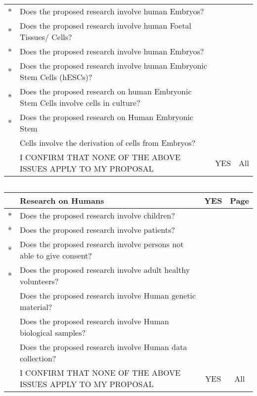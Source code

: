 \documentclass[12pt]{article}
\begin{document}
{\footnotesize
\begin{tabular}{|c|l|c|c|}
\hline
$\ast$ &      Does the proposed research involve human Embryos?             &  &                      \\
$\ast$  &       Does the proposed research involve human Foetal Tissues/ Cells?         &  &           \\
\hline
$\ast$ &      Does the proposed research involve human Embryos?             &  &                      \\
\hline
$\ast$ &        Does the proposed research involve human Embryonic Stem Cells (hESCs)?       &  &       \\
\hline
$\ast$ &        Does the proposed research on human Embryonic Stem Cells involve cells in culture?       &  &    \\
\hline
$\ast$ &        Does the proposed research on Human Embryonic Stem  &  & \\
&Cells involve the derivation of cells from Embryos?   &  & \\
\hline
      &    I CONFIRM THAT NONE OF THE ABOVE ISSUES APPLY TO MY PROPOSAL    &     YES  &    All     \\
\hline
\end{tabular}

$\;$\\ $\;$\\
\begin{tabular}{|c|l|c|c|}
\hline
       &    Research on Humans   &    YES   &    Page                                                    \\
\hline
$\ast$  &       Does the proposed research involve children?    &  &                                     \\
\hline
$\ast$  &       Does the proposed research involve patients?        &  &                                 \\
\hline
$\ast$  &       Does the proposed research involve persons not able to give consent?    &  &             \\
\hline
$\ast$ &        Does the proposed research involve adult healthy volunteers?     &  &                    \\
\hline
       &   Does the proposed research involve Human genetic material?         &  &                       \\
\hline
       &   Does the proposed research involve Human biological samples?      &  &                        \\
\hline
       &   Does the proposed research involve Human data collection?         &  &                        \\
\hline
       &   I CONFIRM THAT NONE OF THE ABOVE ISSUES APPLY TO MY PROPOSAL   &   YES &      All             \\
\hline
\end{tabular}

}
\end{document}
